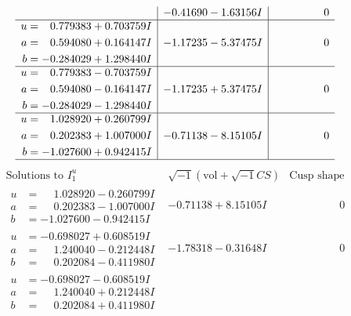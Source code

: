 \documentclass[1p]{elsarticle_modified}
\theoremstyle{definition}
\newcommand{\I}{\sqrt{-1}}
\begin{document}
$$\begin{array}{c|c|c}
 & -0.41690 - 1.63156 I & \phantom{-0.000000 } 0 \\ \hline\begin{aligned}
u &= \phantom{-}0.779383 + 0.703759 I \\
a &= \phantom{-}0.594080 + 0.164147 I \\
b &= -0.284029 + 1.298440 I\end{aligned}
 & -1.17235 - 5.37475 I & \phantom{-0.000000 } 0 \\ \hline\begin{aligned}
u &= \phantom{-}0.779383 - 0.703759 I \\
a &= \phantom{-}0.594080 - 0.164147 I \\
b &= -0.284029 - 1.298440 I\end{aligned}
 & -1.17235 + 5.37475 I & \phantom{-0.000000 } 0 \\ \hline\begin{aligned}
u &= \phantom{-}1.028920 + 0.260799 I \\
a &= \phantom{-}0.202383 + 1.007000 I \\
b &= -1.027600 + 0.942415 I\end{aligned}
 & -0.71138 - 8.15105 I & \phantom{-0.000000 } 0\\
 \hline 
 \end{array}$$\newpage$$\begin{array}{c|c|c}  
\text{Solutions to }I^u_{1}& \I (\text{vol} + \sqrt{-1}CS) & \text{Cusp shape}\\
 \hline 
\begin{aligned}
u &= \phantom{-}1.028920 - 0.260799 I \\
a &= \phantom{-}0.202383 - 1.007000 I \\
b &= -1.027600 - 0.942415 I\end{aligned}
 & -0.71138 + 8.15105 I & \phantom{-0.000000 } 0 \\ \hline\begin{aligned}
u &= -0.698027 + 0.608519 I \\
a &= \phantom{-}1.240040 - 0.212448 I \\
b &= \phantom{-}0.202084 - 0.411980 I\end{aligned}
 & -1.78318 - 0.31648 I & \phantom{-0.000000 } 0 \\ \hline\begin{aligned}
u &= -0.698027 - 0.608519 I \\
a &= \phantom{-}1.240040 + 0.212448 I \\
b &= \phantom{-}0.202084 + 0.411980 I\end{aligned}

\end{array}$$
\end{document}
